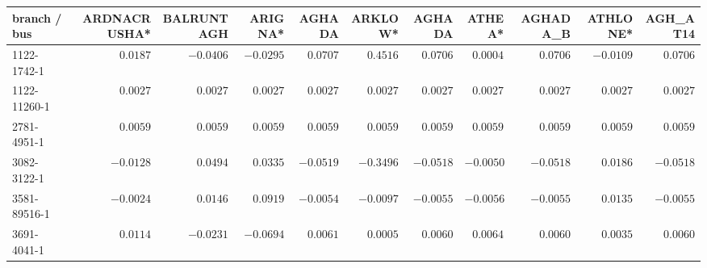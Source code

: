 \setlength{\tabcolsep}{3pt}\renewcommand{\arraystretch}{1.05}
\begin{tabular}{l|rrrrrrrrrr}
{\tiny branch / bus} & {\tiny ARDNACRUSHA*} & {\tiny BALRUNTAGH} & {\tiny ARIGNA*} & {\tiny AGHADA} & {\tiny ARKLOW*} & {\tiny AGHADA} & {\tiny ATHEA*} & {\tiny AGHADA\_B} & {\tiny ATHLONE*} & {\tiny AGH\_AT14}\\ \hline
{\tiny 1122-1742-1} & $0.0187$ & $-0.0406$ & $-0.0295$ & $0.0707$ & $0.4516$ & $0.0706$ & $0.0004$ & $0.0706$ & $-0.0109$ & $0.0706$\\
{\tiny 1122-11260-1} & $0.0027$ & $0.0027$ & $0.0027$ & $0.0027$ & $0.0027$ & $0.0027$ & $0.0027$ & $0.0027$ & $0.0027$ & $0.0027$\\
{\tiny 2781-4951-1} & $0.0059$ & $0.0059$ & $0.0059$ & $0.0059$ & $0.0059$ & $0.0059$ & $0.0059$ & $0.0059$ & $0.0059$ & $0.0059$\\
{\tiny 3082-3122-1} & $-0.0128$ & $0.0494$ & $0.0335$ & $-0.0519$ & $-0.3496$ & $-0.0518$ & $-0.0050$ & $-0.0518$ & $0.0186$ & $-0.0518$\\
{\tiny 3581-89516-1} & $-0.0024$ & $0.0146$ & $0.0919$ & $-0.0054$ & $-0.0097$ & $-0.0055$ & $-0.0056$ & $-0.0055$ & $0.0135$ & $-0.0055$\\
{\tiny 3691-4041-1} & $0.0114$ & $-0.0231$ & $-0.0694$ & $0.0061$ & $0.0005$ & $0.0060$ & $0.0064$ & $0.0060$ & $0.0035$ & $0.0060$
\end{tabular}
